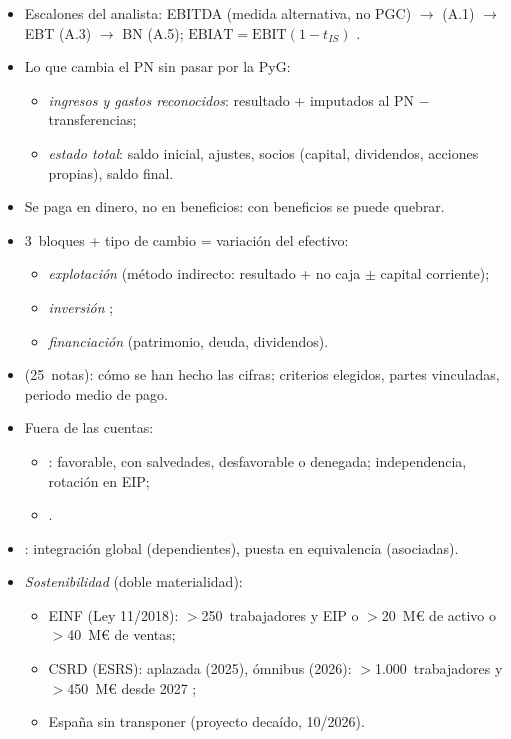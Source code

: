 \documentclass{article}
\begin{document}
\begin{columnas}
\begin{itemize}
\item Escalones del analista: EBITDA (medida alternativa, no PGC) $\to$  (A.1) $\to$ EBT (A.3) $\to$ BN (A.5); $\mathrm{EBIAT}=\mathrm{EBIT}(1-t_{IS})$ .
\end{itemize}
\begin{itemize}
\item Lo que cambia el PN sin pasar por la PyG:
  \begin{itemize}
  \item \emph{ingresos y gastos reconocidos}: resultado + imputados al PN $-$ transferencias;
  \item \emph{estado total}: saldo inicial, ajustes, socios (capital, dividendos, acciones propias), saldo final.
  \end{itemize}
\end{itemize}
\begin{itemize}
\item Se paga en dinero, no en beneficios: con beneficios se puede quebrar.
\item 3~bloques + tipo de cambio = variación del efectivo:
  \begin{itemize}
  \item \emph{explotación} (método indirecto: resultado + no caja $\pm$ capital corriente);
  \item \emph{inversión} ;
  \item \emph{financiación} (patrimonio, deuda, dividendos).
  \end{itemize}
\end{itemize}
\begin{itemize}
\item {} (25~notas): cómo se han hecho las cifras; criterios elegidos, partes vinculadas, periodo medio de pago.
\item Fuera de las cuentas:
  \begin{itemize}
  \item {}: favorable, con salvedades, desfavorable o denegada; independencia, rotación en EIP;
  \item {}.
  \end{itemize}
\item {}: integración global (dependientes), puesta en equivalencia (asociadas).
\item \emph{Sostenibilidad} (doble materialidad):
  \begin{itemize}
  \item EINF (Ley 11/2018): $>$250~trabajadores y EIP o $>$20~M€ de activo o $>$40~M€ de ventas;
  \item CSRD (ESRS): aplazada (2025), ómnibus (2026): $>$1.000~trabajadores y $>$450~M€ desde 2027 ;
  \item España sin transponer (proyecto decaído, 10/2026).
  \end{itemize}
\end{itemize}


\end{columnas}
\end{document}
